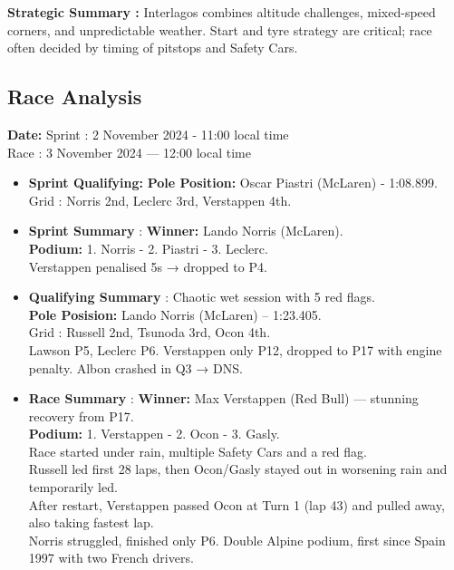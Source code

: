 \textbf{Strategic Summary :} Interlagos combines altitude challenges, mixed-speed corners, and unpredictable weather. Start and tyre strategy are critical; race often decided by timing of pitstops and Safety Cars.

\subsection{Race Analysis}

\textbf{Date:} Sprint : 2 November 2024 - 11:00 local time\\
Race : 3 November 2024 — 12:00 local time 

\begin{itemize}
    \item \textbf{Sprint Qualifying:} \textbf{Pole Position:} Oscar Piastri (McLaren) - 1:08.899.\\
    Grid : Norris 2nd, Leclerc 3rd, Verstappen 4th.
    
    \item \textbf{Sprint Summary} : \textbf{Winner:} Lando Norris (McLaren). \\
    \textbf{Podium:} 1. Norris - 2. Piastri - 3. Leclerc. \\
    Verstappen penalised 5s → dropped to P4.
    
    \item \textbf{Qualifying Summary} : Chaotic wet session with 5 red flags. \\
    \textbf{Pole Posision:} Lando Norris (McLaren) – 1:23.405. \\
    Grid : Russell 2nd, Tsunoda 3rd, Ocon 4th. \\
    Lawson P5, Leclerc P6. Verstappen only P12, dropped to P17 with engine penalty. Albon crashed in Q3 → DNS.
    
    \item \textbf{Race Summary} : \textbf{Winner:} Max Verstappen (Red Bull) — stunning recovery from P17. \\
    \textbf{Podium:} 1. Verstappen - 2. Ocon - 3. Gasly. \\
    Race started under rain, multiple Safety Cars and a red flag. \\
    Russell led first 28 laps, then Ocon/Gasly stayed out in worsening rain and temporarily led. \\
    After restart, Verstappen passed Ocon at Turn 1 (lap 43) and pulled away, also taking fastest lap. \\
    Norris struggled, finished only P6. Double Alpine podium, first since Spain 1997 with two French drivers.
    

\end{itemize}
